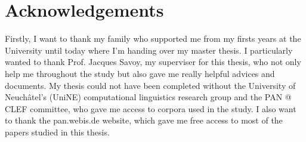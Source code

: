 \vspace*{\fill}
\chapter*{\centering Acknowledgements}
Firstly, I want to thank my family who supported me from my firsts years at the University until today where I'm handing over my master thesis.
I particularly wanted to thank Prof. Jacques Savoy, my superviser for this thesis, who not only help me throughout the study but also gave me really helpful advices and documents.
My thesis could not have been completed without the University of Neuchâtel's (UniNE) computational linguistics research group and the PAN @ CLEF committee, who gave me access to corpora used in the study.
I also want to thank the pan.webis.de website, which gave me free access to most of the papers studied in this thesis.
\vspace*{\fill}
